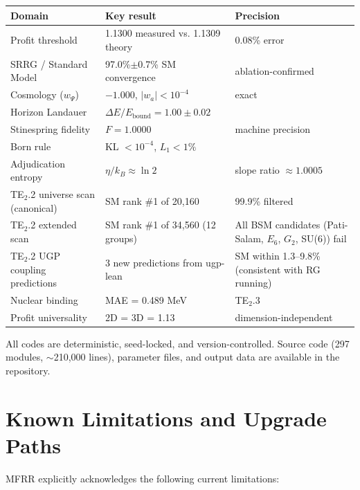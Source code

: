 \documentclass[11pt]{article}
\begin{document}
\begin{center}
\small
\begin{tabular}{@{}lll@{}}
\toprule
Domain & Key result & Precision \\
\midrule
Profit threshold & 1.1300 measured vs. 1.1309 theory & 0.08\% error \\
SRRG / Standard Model & 97.0\%$\pm$0.7\% SM convergence & ablation-confirmed \\
Cosmology ($w_\Psi$) & $-1.000$, $|w_a|<10^{-4}$ & exact \\
Horizon Landauer & $\Delta E/E_\mathrm{bound}=1.00\pm0.02$ & \\
Stinespring fidelity & $F=1.0000$ & machine precision \\
Born rule & KL $<10^{-4}$, $L_1<1\%$ & \\
Adjudication entropy & $\eta/k_B\approx\ln 2$ & slope ratio $\approx1.0005$ \\
TE$_2$.2 universe scan (canonical) & SM rank \#1 of 20,160 & 99.9\% filtered \\
TE$_2$.2 extended scan & SM rank \#1 of 34,560 (12 groups) & All BSM candidates (Pati-Salam, $E_6$, $G_2$, SU(6)) fail \\
TE$_2$.2 UGP coupling predictions & 3 new predictions from ugp-lean & SM within 1.3--9.8\% (consistent with RG running) \\
Nuclear binding & MAE = 0.489 MeV & TE$_2$.3 \\
Profit universality & 2D = 3D = 1.13 & dimension-independent \\
\bottomrule
\end{tabular}
\end{center}

All codes are deterministic, seed-locked, and version-controlled. Source code (297 modules, $\sim$210,000 lines), parameter files, and output data are available in the repository.

\section{Known Limitations and Upgrade Paths}

MFRR explicitly acknowledges the following current limitations:
\end{document}

